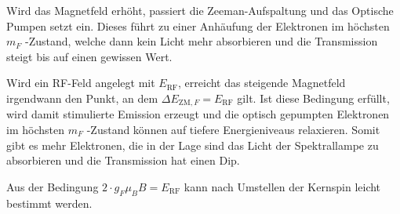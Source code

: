         Wird das Magnetfeld erhöht, passiert die Zeeman-Aufspaltung und das Optische Pumpen setzt ein. Dieses führt zu einer Anhäufung der Elektronen im höchsten $m_F$ -Zustand, welche dann kein Licht mehr absorbieren und die Transmission steigt bis auf einen gewissen Wert.

        Wird ein RF-Feld angelegt mit $E_{\text{RF}}$, erreicht das steigende Magnetfeld irgendwann den Punkt, an dem $\Delta E_{\text{ZM},F} = E_{\text{RF}}$ gilt. Ist diese Bedingung erfüllt, wird damit stimulierte Emission erzeugt und die optisch gepumpten Elektronen im höchsten $m_F$ -Zustand können auf tiefere Energieniveaus relaxieren. Somit gibt es mehr Elektronen, die in der Lage sind das Licht der Spektrallampe zu absorbieren und die Transmission hat einen Dip.

        Aus der Bedingung $2 \cdot g_F \mu_B B = E_{\text{RF}}$ kann nach Umstellen der Kernspin leicht bestimmt werden.